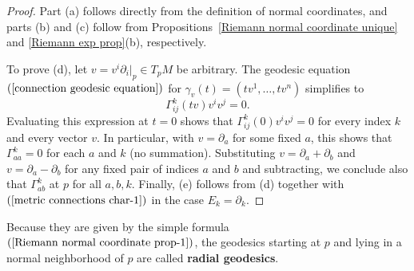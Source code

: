 \begin{proof}
Part (a) follows directly from the definition of normal coordinates, and parts (b) and (c) follow from Propositions~\ref{Riemann normal coordinate unique} and 
\ref{Riemann exp prop}(b), respectively.\par
To prove (d), let $v=v^i\partial_i|_p\in T_pM$ be arbitrary. The geodesic equation $(\ref{connection geodesic equation})$ for $\gamma_v(t)=(tv^1,\dots,tv^n)$ 
simplifies to
\[\Gamma_{ij}^k(tv)v^iv^j=0.\]
Evaluating this expression at $t=0$ shows that $\Gamma_{ij}^k(0)v^iv^j=0$ for every index $k$ and every vector $v$. In particular, with $v=\partial_a$ for some fixed $a$, 
this shows that $\Gamma_{aa}^k=0$ for each $a$ and $k$ (no summation). Substituting $v=\partial_a+\partial_b$ and $v=\partial_a-\partial_b$ for any fixed pair of indices 
$a$ and $b$ and subtracting, we conclude also that $\Gamma_{ab}^k$ at $p$ for all $a,b,k$. Finally, (e) follows from (d) together with $(\ref{metric connections char-1})$ 
in the case $E_k=\partial_k$.
\end{proof}
Because they are given by the simple formula $(\ref{Riemann normal coordinate prop-1})$, the geodesics starting at $p$ and lying in a normal neighborhood of $p$ are 
called \textbf{radial geodesics}.
